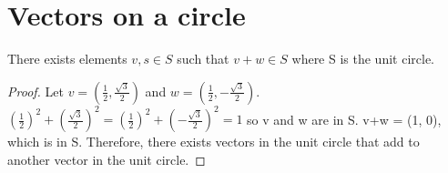 \section{Vectors on a circle}
There exists elements $v, s \in S$ such that $v + w \in S$ where S is the unit circle.
\begin{proof} 
    Let $v = (\frac{1}{2}, \frac{\sqrt{3}}{2})$ and $w = (\frac{1}{2}, -\frac{\sqrt{3}}{2})$. 
    $(\frac{1}{2})^2 + (\frac{\sqrt{3}}{2})^2 = (\frac{1}{2})^2 + (-\frac{\sqrt{3}}{2})^2 = 1$ so
    v and w are in S.
    v+w = (1, 0), which is in S. 
    Therefore, there exists vectors in the unit circle that add to another vector in the unit circle.
\end{proof}